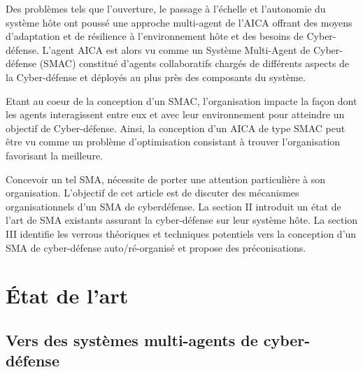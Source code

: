 \documentclass[conference]{IEEEtran}
\begin{document}
Des problèmes tels que l'ouverture, le passage à l'échelle et l'autonomie du système hôte ont poussé une approche multi-agent de l'AICA offrant des moyens d'adaptation et de résilience à l'environnement hôte et des besoins de Cyber-défense. L'agent AICA est alors vu comme un Système Multi-Agent de Cyber-défense (SMAC) constitué d'agents collaboratifs chargés de différents aspects de la Cyber-défense et déployés au plus près des composants du système\cite{ieeesp_KottT20}.

Etant au coeur de la conception d'un SMAC, l'organisation impacte la façon dont les agents interagissent entre eux et avec leur environnement pour atteindre un objectif de Cyber-défense. Ainsi, la conception d'un AICA de type SMAC peut être vu comme un problème d'optimisation consistant à trouver l'organisation favorisant la meilleure.


Concevoir un tel SMA, nécessite de porter une attention particulière à son organisation. L'objectif de cet article est de discuter des mécanismes organisationnels d'un SMA de cyberdéfense.
La section II introduit un état de l'art de SMA existants assurant la cyber-défense sur leur système hôte. La section III identifie les verrous théoriques et techniques potentiels vers la conception d'un SMA de cyber-défense auto/ré-organisé et propose des préconisations.

\section{\'Etat de l'art}

\subsection{Vers des systèmes multi-agents de cyber-défense}


\end{document}
